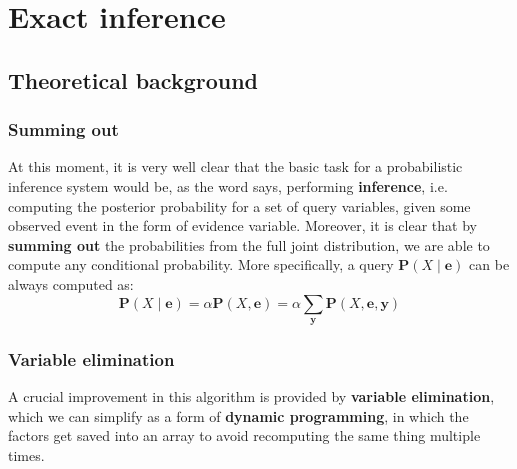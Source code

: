 \section{Exact inference}
\label{sec:exactinference}
\subsection{Theoretical background}
\subsubsection{Summing out}
At this moment, it is very well clear that the basic task for a probabilistic inference system would be, as the word says, performing \textbf{inference}, i.e. computing the posterior probability for a set of query variables, given some observed event in the form of evidence variable. Moreover, it is clear that by \textbf{summing out} the probabilities from the full joint distribution, we are able to compute any conditional probability. More specifically, a query $\mathbf{P}(X \mid \mathbf{e})$ can be always computed as:
\begin{equation}
    \mathbf{P}(X \mid \mathbf{e})=\alpha \mathbf{P}(X, \mathbf{e})=\alpha \sum_{\mathbf{y}} \mathbf{P}(X, \mathbf{e}, \mathbf{y})
\end{equation}
\subsubsection{Variable elimination}
A crucial improvement in this algorithm is provided by \textbf{variable elimination}, which we can simplify as a form of \textbf{dynamic programming}, in which the factors get saved into an array to avoid recomputing the same thing multiple times.
